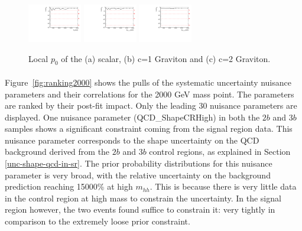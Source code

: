 \begin{figure}[htbp!]
\begin{center}
\includegraphics[width=0.21\textwidth,angle=-90]{figures/boosted/results/p0_s_allmasses_boosted.pdf}
\includegraphics[width=0.21\textwidth,angle=-90]{figures/boosted/results/p0_g10_allmasses_boosted.pdf}
\includegraphics[width=0.21\textwidth,angle=-90]{figures/boosted/results/p0_g20_allmasses_boosted.pdf} 
\caption{Local $p_0$ of the (a) scalar, (b) c=1 Graviton and (c) c=2 Graviton.}
\label{fig:localp0}
\end{center}
\end{figure}

\paragraph{}
Figure~\ref{fig:ranking2000} shows the pulls of the systematic uncertainty nuisance parameters and their correlations for the 2000 GeV mass point. 
The parameters are ranked by their post-fit impact. 
Only the leading 30 nuisance parameters are displayed.
One nuisance parameter (QCD\_ShapeCRHigh) in both the $2b$ and $3b$ samples shows a significant constraint coming from the signal region data. 
This nuisance parameter corresponds to the shape uncertainty on the QCD background derived from the $2b$ and $3b$ control regions, as explained in Section \ref{unc-shape-qcd-in-sr}. 
The prior probability distributions for this nuisance parameter is very broad, with the relative uncertainty on the background prediction reaching 15000\% at high $m_{hh}$. 
This is because there is very little data in the control region at high mass to constrain the uncertainty. 
In the signal region however, the two events found suffice to constrain it: very tightly in comparison to the extremely loose prior constraint.

